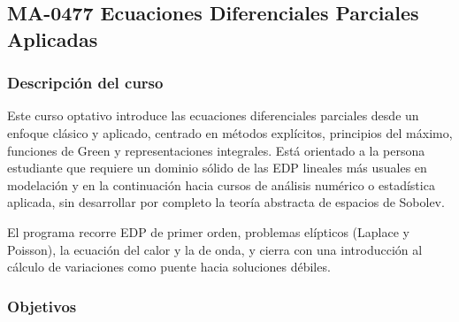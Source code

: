 \newpage
\subsection*{MA-0477 Ecuaciones Diferenciales Parciales Aplicadas}

\hypertarget{MA0477}{}
\begin{refsection}
\begin{table}[H]
\end{table}

\subsubsection*{Descripción del curso}

Este curso optativo introduce las ecuaciones diferenciales parciales desde un enfoque clásico y aplicado, centrado en métodos explícitos, principios del máximo, funciones de Green y representaciones integrales. Está orientado a la persona estudiante que requiere un dominio sólido de las EDP lineales más usuales en modelación y en la continuación hacia cursos de análisis numérico o estadística aplicada, sin desarrollar por completo la teoría abstracta de espacios de Sobolev.

El programa recorre EDP de primer orden, problemas elípticos (Laplace y Poisson), la ecuación del calor y la de onda, y cierra con una introducción al cálculo de variaciones como puente hacia soluciones débiles. 

\subsubsection*{Objetivos}


\end{refsection}
